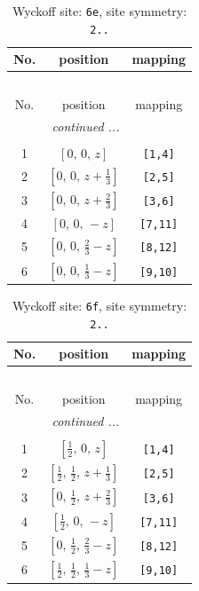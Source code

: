\documentclass[fleqn,8pt]{jsarticle}
\begin{document}
\begin{longtable}{ccc}
\caption{Wyckoff site: {\tt 6e}, site symmetry: {\tt 2..}}
 \\
 \hline \hline
No. & position & mapping \\ \hline \endfirsthead

\multicolumn{2}{l}{\tablename\ \thetable{}} \\
 \hline \hline
No. & position & mapping \\ \hline \endhead

 \hline \hline
\multicolumn{2}{r}{\footnotesize\it continued ...} \\ \endfoot

 \hline \hline
\multicolumn{2}{r}{} \\ \endlastfoot

1 & $\left[ 0,\, 0,\, z \right]$ & {\tt [1,4]} \\ \hline
2 & $\left[ 0,\, 0,\, z + \frac{1}{3} \right]$ & {\tt [2,5]} \\ \hline
3 & $\left[ 0,\, 0,\, z + \frac{2}{3} \right]$ & {\tt [3,6]} \\ \hline
4 & $\left[ 0,\, 0,\, - z \right]$ & {\tt [7,11]} \\ \hline
5 & $\left[ 0,\, 0,\, \frac{2}{3} - z \right]$ & {\tt [8,12]} \\ \hline
6 & $\left[ 0,\, 0,\, \frac{1}{3} - z \right]$ & {\tt [9,10]} \\
\end{longtable}
\renewcommand{\arraystretch}{1.2}
\begin{longtable}{ccc}
\caption{Wyckoff site: {\tt 6f}, site symmetry: {\tt 2..}}
 \\
 \hline \hline
No. & position & mapping \\ \hline \endfirsthead

\multicolumn{2}{l}{\tablename\ \thetable{}} \\
 \hline \hline
No. & position & mapping \\ \hline \endhead

 \hline \hline
\multicolumn{2}{r}{\footnotesize\it continued ...} \\ \endfoot

 \hline \hline
\multicolumn{2}{r}{} \\ \endlastfoot

1 & $\left[ \frac{1}{2},\, 0,\, z \right]$ & {\tt [1,4]} \\ \hline
2 & $\left[ \frac{1}{2},\, \frac{1}{2},\, z + \frac{1}{3} \right]$ & {\tt [2,5]} \\ \hline
3 & $\left[ 0,\, \frac{1}{2},\, z + \frac{2}{3} \right]$ & {\tt [3,6]} \\ \hline
4 & $\left[ \frac{1}{2},\, 0,\, - z \right]$ & {\tt [7,11]} \\ \hline
5 & $\left[ 0,\, \frac{1}{2},\, \frac{2}{3} - z \right]$ & {\tt [8,12]} \\ \hline
6 & $\left[ \frac{1}{2},\, \frac{1}{2},\, \frac{1}{3} - z \right]$ & {\tt [9,10]} \\
\end{longtable}
\end{document}
